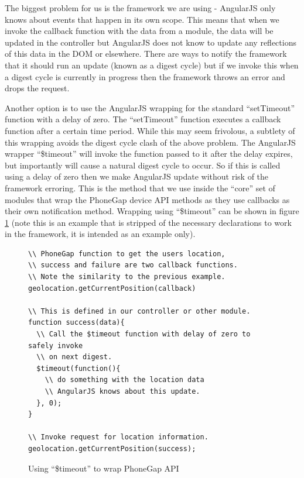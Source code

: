 The biggest problem for us is the framework we are using - AngularJS
only knows about events that happen in its own scope. This means that
when we invoke the callback function with the data from a module, the
data will be updated in the controller but AngularJS does not know to
update any reflections of this data in the DOM or elsewhere. There are
ways to notify the framework that it should run an update (known as a
digest cycle)\cite{angularjs_apply} but if we invoke this when a
digest cycle is currently in progress then the framework throws an
error and drops the request.

Another option is to use the AngularJS wrapping for the standard
``setTimeout'' function with a delay of zero. The ``setTimeout''
function executes a callback function after a certain time
period\cite{setTimeout}. While this may seem
frivolous, a subtlety of this wrapping avoids the digest cycle clash
of the above problem. The AngularJS wrapper ``\$timeout'' will invoke
the function passed to it after the delay expires, but importantly
will cause a natural digest cycle to occur. So if this is called using
a delay of zero then we make AngularJS update without risk of the
framework erroring. This is the method that we use inside the ``core''
set of modules that wrap the PhoneGap device API
methods\cite{wrappingPhonegap} as they use callbacks as their own
notification method. Wrapping using ``\$timeout'' can be shown in
figure \ref{fig:timeout} (note this is an example that is stripped of
the necessary declarations to work in the framework, it is intended as
an example only).

\begin{figure}[h]
\begin{verbatim}
\\ PhoneGap function to get the users location,
\\ success and failure are two callback functions.
\\ Note the similarity to the previous example.
geolocation.getCurrentPosition(callback)

\\ This is defined in our controller or other module.
function success(data){
  \\ Call the $timeout function with delay of zero to safely invoke
  \\ on next digest.
  $timeout(function(){
    \\ do something with the location data
    \\ AngularJS knows about this update.
  }, 0);
}

\\ Invoke request for location information.
geolocation.getCurrentPosition(success);
\end{verbatim}
\caption{Using ``\$timeout'' to wrap PhoneGap API}
\label{fig:timeout}
\end{figure}

